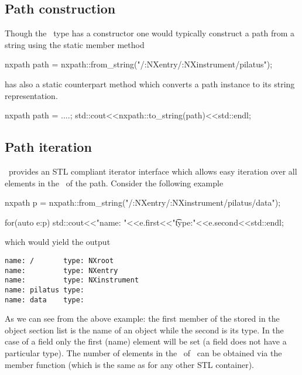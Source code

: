 \subsection{Path construction}

Though the \nxpath\ type has a constructor one would typically construct 
a path from a string using the  static member method
\begin{cppcode}
nxpath path = nxpath::from_string("/:NXentry/:NXinstrument/pilatus");
\end{cppcode}
 has also a static counterpart method  which 
converts a path instance to its string representation.
\begin{cppcode}
nxpath path = ....;
std::cout<<nxpath::to_string(path)<<std::endl;
\end{cppcode}

\subsection{Path iteration}

\nxpath\ provides an STL compliant iterator interface which allows easy
iteration over all elements in the \osection\ of the path. Consider the 
following example
\begin{cppcode}
nxpath p = nxpath::from_string("/:NXentry/:NXinstrument/pilatus/data");

for(auto e:p)
    std::cout<<"name: "<<e.first<<"\t type:"<<e.second<<std::endl;
\end{cppcode}
which would yield the output
\begin{verbatim}
name: /       type: NXroot
name:         type: NXentry
name:         type: NXinstrument
name: pilatus type: 
name: data    type: 
\end{verbatim}
As we can see from the above example: the first member of the
 stored in the object section list is the 
name of an object while the second is its type. In the case of a field 
only the first (name) element will be set (a field does not have a 
particular type). 
The number of elements in the \osection\ of \nxpath\ can be obtained via the 
 member function (which is the same as for any other STL container).

